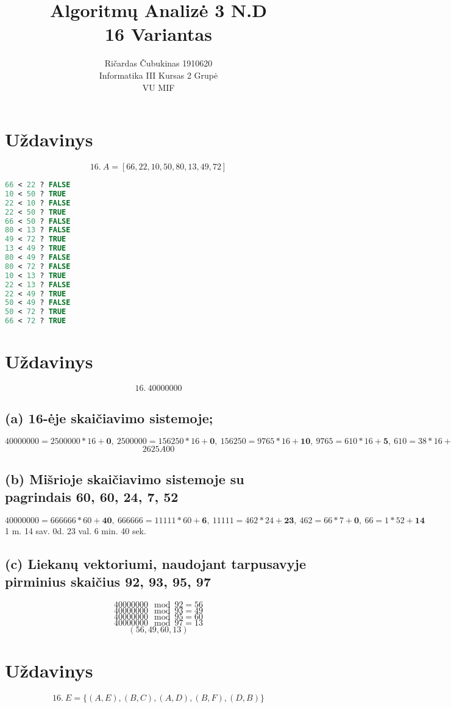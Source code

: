 \documentclass[a4paper,lithuanian]{article}
\title{Algoritmų Analizė 3 N.D\\16 Variantas}
\author{
  Ričardas Čubukinas 1910620\\
  Informatika III Kursas 2 Grupė\\
  VU MIF
}
\begin{document}
\maketitle

\section{Uždavinys}
\[16.~A = [66,22,10,50,80,13,49,72]\]
\begin{lstlisting}[language=Pascal]
66 < 22 ? FALSE
10 < 50 ? TRUE
22 < 10 ? FALSE
22 < 50 ? TRUE
66 < 50 ? FALSE
80 < 13 ? FALSE
49 < 72 ? TRUE
13 < 49 ? TRUE
80 < 49 ? FALSE
80 < 72 ? FALSE
10 < 13 ? TRUE
22 < 13 ? FALSE
22 < 49 ? TRUE
50 < 49 ? FALSE
50 < 72 ? TRUE
66 < 72 ? TRUE
\end{lstlisting}
\pagebreak
\section{Uždavinys}
\[16.~40000000\]
\subsection*{(a) 16-ėje skaičiavimo sistemoje;}
$40000000 = 2500000 * 16+\mathbf{0},~2500000 = 156250 * 16+\mathbf{0},~156250 = 9765 * 16 + \mathbf{10},~9765=610 * 16 + \mathbf{5},~610=38*16+\mathbf{2},~38=2*16+\mathbf{6},~2=0*16+\mathbf{2}$
\[2625A00\]

\subsection*{(b) Mišrioje skaičiavimo sistemoje su pagrindais 60, 60, 24, 7, 52}
$40000000 = 666666 * 60 + \mathbf{40},~666666=11111 * 60 + \mathbf{6},~11111=462 * 24 + \mathbf{23},~462=66 * 7 +\mathbf{0},~66 = 1 * 52 + \mathbf{14}$\\
1 m. 14 sav. 0d. 23 val. 6 min. 40 sek.

\subsection*{(c) Liekanų vektoriumi, naudojant tarpusavyje pirminius skaičius 92, 93, 95, 97}

\[40000000 \mod 92 = 56\]
\[40000000 \mod 93 = 49\]
\[40000000 \mod 95 = 60\]
\[40000000 \mod 97 = 13\]
\[(56,49,60,13)\]
\pagebreak
\section{Uždavinys}
\[16.~E = \{(A, E), (B, C), (A, D), (B, F), (D, B)\}\]
\end{document}
